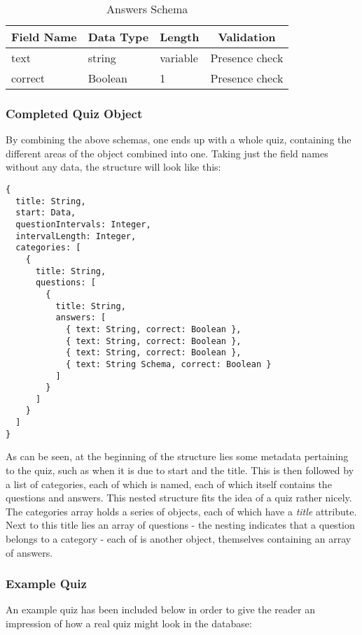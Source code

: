\begin{table}[!htbp]
\centering
\begin{tabular}{|l|l|l|l|}
\hline
\multicolumn{1}{|c|}{{\bf Field Name}} & \multicolumn{1}{c|}{{\bf Data Type}} & \multicolumn{1}{c|}{{\bf Length}} & \multicolumn{1}{c|}{{\bf Validation}} \\ \hline
text & string & variable & Presence check \\ \hline
correct & Boolean & 1 & Presence check \\ \hline
\end{tabular}
\caption{Answers Schema}
\end{table}


\subsubsection{Completed Quiz Object}
By combining the above schemas, one ends up with a whole quiz, containing the different areas of the object combined into one. Taking just the field names without any data, the structure will look like this:

\begin{Verbatim}[fontsize=\small]
{
  title: String,
  start: Data,
  questionIntervals: Integer,
  intervalLength: Integer,
  categories: [
    {
      title: String,
      questions: [
        {
          title: String,
          answers: [
            { text: String, correct: Boolean },
            { text: String, correct: Boolean },
            { text: String, correct: Boolean },
            { text: String Schema, correct: Boolean }
          ]
        }
      ]
    }
  ]
}
\end{Verbatim}

As can be seen, at the beginning of the structure lies some metadata pertaining to the quiz, such as when it is due to start and the title. This is then followed by a list of categories, each of which is named, each of which itself contains the questions and answers. This nested structure fits the idea of a quiz rather nicely. The categories array holds a series of objects, each of which have a \textit{title} attribute. Next to this title lies an array of questions - the nesting indicates that a question belongs to a category - each of is another object, themselves containing an array of answers.

\subsubsection{Example Quiz}
An example quiz has been included below in order to give the reader an impression of how a real quiz might look in the database:

